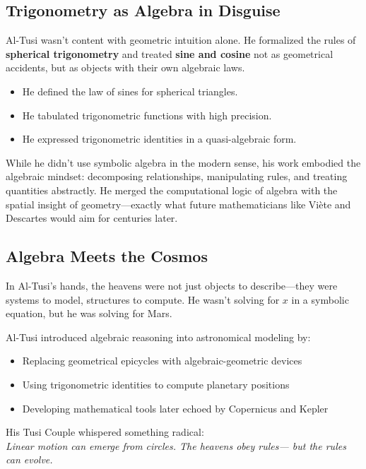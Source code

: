 \subsection{Trigonometry as Algebra in Disguise}

Al-Tusi wasn’t content with geometric intuition alone. He formalized the rules of \textbf{spherical trigonometry} and treated \textbf{sine and cosine} not as geometrical accidents, but as objects with their own algebraic laws.

\begin{itemize}
  \item He defined the law of sines for spherical triangles.
  \item He tabulated trigonometric functions with high precision.
  \item He expressed trigonometric identities in a quasi-algebraic form.
\end{itemize}

While he didn’t use symbolic algebra in the modern sense, his work embodied the algebraic mindset: decomposing relationships, manipulating rules, and treating quantities abstractly. He merged the computational logic of algebra with the spatial insight of geometry—exactly what future mathematicians like Viète and Descartes would aim for centuries later.

\subsection{Algebra Meets the Cosmos}

In Al-Tusi’s hands, the heavens were not just objects to describe—they were systems to model, structures to compute. He wasn’t solving for \( x \) in a symbolic equation, but he was solving for Mars.

\begin{tcolorbox}[colback=blue!5!white, colframe=blue!50!black, title={Al-Tusi’s Astronomical Legacy}]
Al-Tusi introduced algebraic reasoning into astronomical modeling by:

\begin{itemize}
  \item Replacing geometrical epicycles with algebraic-geometric devices
  \item Using trigonometric identities to compute planetary positions
  \item Developing mathematical tools later echoed by Copernicus and Kepler
\end{itemize}

His Tusi Couple whispered something radical:
\\[0.5em]
\textit{Linear motion can emerge from circles.  
The heavens obey rules—  
but the rules can evolve.}
\end{tcolorbox}
